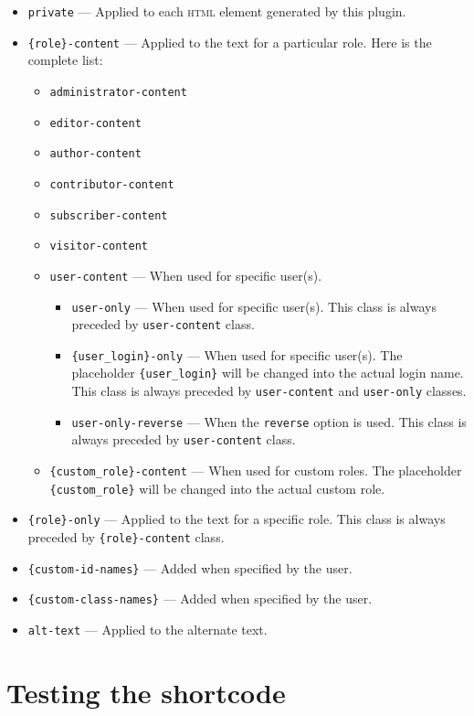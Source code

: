 \begin{itemize}
 \item \verb+private+ --- Applied to each \textsc{html} element generated by this
 plugin.
 \item \verb+{role}-content+ --- Applied to the text for a particular role. Here
 is the complete list:
 \begin{itemize}
  \item \verb+administrator-content+
  \item \verb+editor-content+
  \item \verb+author-content+
  \item \verb+contributor-content+
  \item \verb+subscriber-content+
  \item \verb+visitor-content+
  \item \verb+user-content+ --- When used for specific user(s).
  \begin{itemize}
   \item \verb+user-only+ --- When used for specific user(s). This class is
   always preceded by \verb+user-content+ class.
    \item \verb+{user_login}-only+ --- When used for specific user(s). The
    placeholder \verb+{user_login}+ will be changed into the actual login name.
    This class is always preceded by \verb+user-content+ and \verb+user-only+
    classes.
    \item \verb+user-only-reverse+ --- When the \verb+reverse+ option is used.
    This class is always preceded by \verb+user-content+ class.
  \end{itemize}
  \item \verb+{custom_role}-content+ --- When used for custom roles. The
  placeholder \verb+{custom_role}+ will be changed into the actual custom role.
  \end{itemize}
 \item \verb+{role}-only+ --- Applied to the text for a specific role. This
 class is always preceded by \verb+{role}-content+ class.
 \item \verb+{custom-id-names}+ --- Added when specified by the user.
 \item \verb+{custom-class-names}+ --- Added when specified by the user.
 \item \verb+alt-text+ --- Applied to the alternate text.
\end{itemize}

\chapter{Testing the shortcode}

